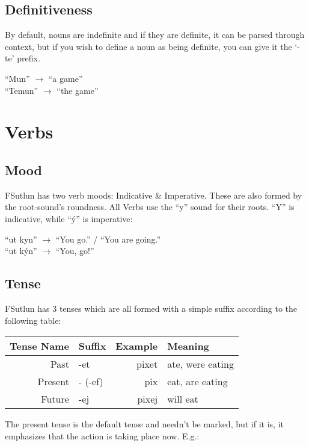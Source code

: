 \documentclass{book}
\begin{document}
\subsection{Definitiveness}
By default, nouns are indefinite and if they are definite, it can be parsed through context,
but if you wish to define a noun as being definite, you can give it the `-te' prefix.

\begin{center}
    ``Mun'' $\rightarrow$ ``a game'' \\
    ``Temun'' $\rightarrow$ ``the game''
\end{center}


\section{Verbs}
\subsection{Mood}
FSutlun has two verb moods: Indicative \& Imperative. These are also formed by the root-sound's roundness.
All Verbs use the ``y'' sound for their roots. ``Y'' is indicative, while ``ý'' is imperative:

\begin{center}
    ``ut kyn'' $\rightarrow$ ``You go.'' / ``You are going.'' \\
    ``ut kýn'' $\rightarrow$ ``You, go!''
\end{center}

\subsection{Tense}
FSutlun has 3 tenses which are all formed with a simple suffix according to the following table:

\begin{center}
    \begin{tabular}{|r|l|r|l|}
        \hline
        Tense Name  & Suffix    & Example   & Meaning \\
        \hline
        Past        & -et       & pixet     & ate, were eating \\
        Present     & - (-ef)   & pix       & eat, are eating \\
        Future      & -ej       & pixej     & will eat \\
        \hline
    \end{tabular}
\end{center}
The present tense is the default tense and needn't be marked, but if it is, it emphasizes that
the action is taking place now. E.g.:
\end{document}
